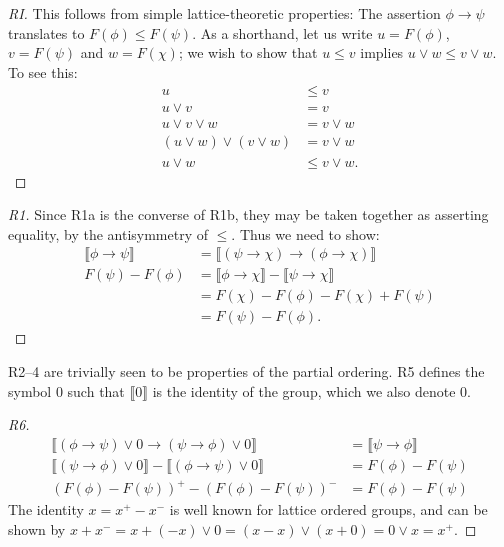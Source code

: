 \documentclass[journal]{IEEEtran}
\theoremstyle{definition}
\newcommand{\interp}[1]{\llbracket #1 \rrbracket}
\begin{document}
\begin{proof}[RI]
  This follows from simple lattice-theoretic properties: The assertion
  $\phi \rightarrow \psi$ translates to $F(\phi) \le F(\psi)$. As a
  shorthand, let us write $u = F(\phi)$, $v = F(\psi)$ and $w =
  F(\chi)$; we wish to show that $u\le v$ implies $u\lor w \le v \lor
  w$. To see this:
  \begin{align*}
    u &\le v\\
    u\lor v &= v\\
    u\lor v\lor w &= v\lor w\\
    (u\lor w)\lor (v\lor w) &= v\lor w\\
    u\lor w &\le v\lor w.
  \end{align*}
\end{proof}

\begin{proof}[R1]
  Since R1a is the converse of R1b, they may be taken together as
  asserting equality, by the antisymmetry of $\le$. Thus we need to
  show:
  \begin{align*}
    \interp{\phi \rightarrow \psi} & = \interp{(\psi \rightarrow
      \chi) \rightarrow (\phi \rightarrow \chi)}\\
    F(\psi) - F(\phi) & = \interp{\phi \rightarrow \chi} -
    \interp{\psi \rightarrow \chi}\\
    & = F(\chi) - F(\phi) - F(\chi) + F(\psi)\\
    & = F(\psi) - F(\phi).
  \end{align*}
\end{proof}
R2--4 are trivially seen to be properties of the partial ordering. R5
defines the symbol 0 such that $\interp{0}$ is the identity of the
group, which we also denote 0.

\begin{proof}[R6]
\begin{align*}
  \interp{(\phi \rightarrow \psi)\lor 0 \rightarrow (\psi \rightarrow \phi) \lor 0} &= \interp{\psi \rightarrow \phi}\\
  \interp{(\psi \rightarrow \phi) \lor 0} - \interp{(\phi \rightarrow \psi)\lor 0} &= F(\phi) - F(\psi)\\
  (F(\phi) - F(\psi))^+ - (F(\phi) - F(\psi))^- & =F(\phi) - F(\psi)
\end{align*}
The identity $x = x^+ - x^-$ is
well known for lattice ordered groups, and can be shown by $x + x^- =
x + (-x)\lor 0 = (x - x)\lor(x + 0) = 0\lor x = x^+$.
\end{proof}
\end{document}
